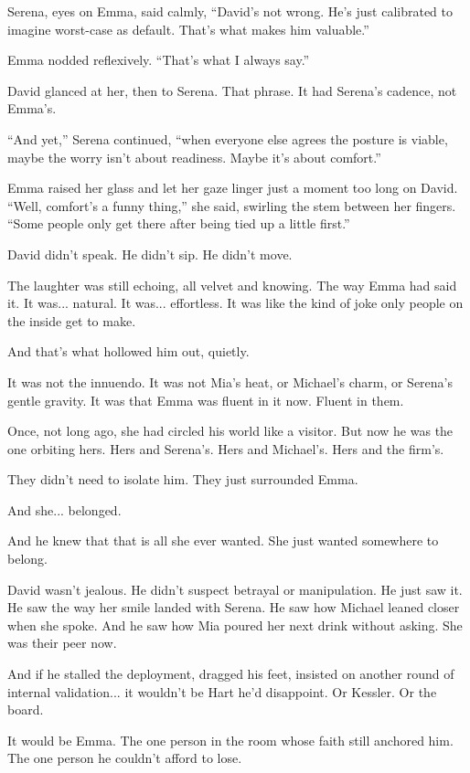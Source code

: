Serena, eyes on Emma, said calmly, ``David’s not wrong. He’s just calibrated to imagine worst-case 
as default. That’s what makes him valuable.''

Emma nodded reflexively. ``That’s what I always say.''

David glanced at her, then to Serena. That phrase. It had Serena’s cadence, not Emma’s. 

``And yet,'' Serena continued, ``when everyone else agrees the posture is viable, maybe the worry 
isn’t about readiness. Maybe it’s about comfort.''

Emma raised her glass and let her gaze linger just a moment too long on David.
``Well, comfort’s a funny thing,'' she said, swirling the stem between her fingers.
``Some people only get there after being tied up a little first.''

David didn’t speak. He didn’t sip. He didn’t move.

The laughter was still echoing, all velvet and knowing. The way Emma had said it. 
It was... natural. It was... effortless. It was like the kind of joke only people on the 
inside get to make.

And that’s what hollowed him out, quietly.

It was not the innuendo. It was not Mia’s heat, or Michael’s charm, or Serena’s gentle gravity. 
It was that Emma was fluent in it now. Fluent in them.

Once, not long ago, she had circled his world like a visitor. But now he was 
the one orbiting hers. Hers and Serena’s. Hers and Michael’s. Hers and the firm’s.

They didn’t need to isolate him.
They just surrounded Emma.

And she... belonged.

And he knew that that is all she ever wanted. She just wanted somewhere to belong.

David wasn’t jealous. He didn’t suspect betrayal or manipulation. He just saw it. He saw the 
way her smile landed with Serena. He saw how Michael leaned closer when she spoke. And he saw how Mia 
poured her next drink without asking. She was their peer now. 

And if he stalled the deployment, dragged his feet, insisted on another round of internal validation... 
it wouldn’t be Hart he’d disappoint. Or Kessler. Or the board.

It would be Emma.
The one person in the room whose faith still anchored him.
The one person he couldn’t afford to lose.


